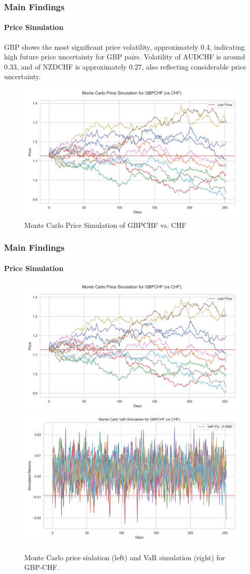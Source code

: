\documentclass[10pt]{beamer}
\begin{document}
\begin{frame}
\frametitle{Main Findings}
\framesubtitle{Price Simulation}
GBP shows the most significant price volatility, approximately 0.4, indicating high future price uncertainty for GBP pairs. Volatility of AUDCHF is around 0.33, and of NZDCHF is approximately
0.27, also reflecting considerable price uncertainty.
\begin{figure}[h]
    \centering  \includegraphics[width=0.75\linewidth]{reports/figures/monte_carlo_price_simulation_GBPCHF_vs_CHF.png}
    \caption{Monte Carlo Price Simulation of GBPCHF vs. CHF}  \label{fig:monte_carlo_price_simulation_GBPCHF_vs_CHF}
\end{figure}
\end{frame}
\begin{frame}
\frametitle{Main Findings}
\framesubtitle{Price Simulation}
\begin{figure}
    \centering   \includegraphics[width=0.48\linewidth]{reports/figures/monte_carlo_price_simulation_GBPCHF_vs_CHF.png} \label{fig:monte_carlo_price_simulation_GBPCHF_vs_CHF}
    \includegraphics[width=0.48\linewidth]{reports/figures/monte_carlo_var_simulation_GBPCHF_vs_CHF.png} \label{fig:monte_carlo_var_simulation_GBPCHF_vs_CHF}
    \caption{\footnotesize Monte Carlo price siulation (left) and VaR simulation (right) for GBP-CHF.}
\end{figure}
\end{frame}
\end{document}
